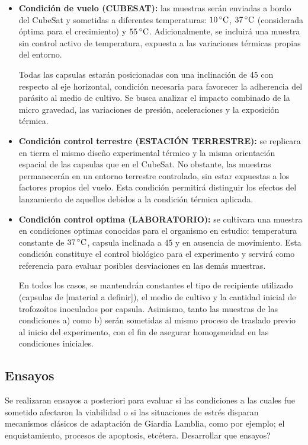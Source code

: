     \begin{itemize}
      \item \textbf{Condición de vuelo (CUBESAT):} las muestras serán enviadas a bordo del CubeSat y
      sometidas a diferentes temperaturas: $10\,^\circ\mathrm{C}$, $37\,^\circ\mathrm{C}$ (considerada óptima para el
      crecimiento) y $55\,^\circ\mathrm{C}$. Adicionalmente, se incluirá una muestra sin control activo de temperatura,
      expuesta a las variaciones térmicas propias del entorno.

      Todas las capsulas estarán posicionadas con una inclinación de 45 con respecto al eje horizontal, condición
      necesaria para favorecer la adherencia del parásito al medio de cultivo. Se busca analizar el
      impacto combinado de la micro gravedad, las variaciones de presión, aceleraciones
      y la exposición térmica.

      \item \textbf{Condición control terrestre (ESTACIÓN TERRESTRE):} se replicara en tierra
      el mismo diseño experimental térmico y la misma orientación espacial de las capsulas
      que en el CubeSat. No obstante, las muestras permanecerán en un entorno terrestre
      controlado, sin estar expuestas a los factores propios del vuelo. Esta condición permitirá
      distinguir los efectos del lanzamiento de aquellos debidos a la condición térmica
      aplicada.

      \item \textbf{Condición control optima (LABORATORIO):} se cultivara una muestra en condiciones optimas
      conocidas para el organismo en estudio: temperatura constante de
      $37\,^\circ\mathrm{C}$, capsula inclinada a 45 y en ausencia de movimiento. Esta condición constituye
      el control biológico para el experimento y servirá como referencia para evaluar posibles
      desviaciones en las demás muestras.

      En todos los casos, se mantendrán constantes el tipo de recipiente utilizado (capsulas de
      [material a definir]), el medio de cultivo y la cantidad inicial de trofozoítos inoculados por
      capsula. Asimismo, tanto las muestras de las condiciones a) como b) serán sometidas al mismo
      proceso de traslado previo al inicio del experimento, con el fin de asegurar homogeneidad en
      las condiciones iniciales.
    \end{itemize}

  \subsection{Ensayos}
    Se realizaran ensayos a posteriori para evaluar si las condiciones a las cuales fue sometido afectaron la viabilidad o si las situaciones de estrés disparan mecanismos clásicos de
    adaptación de Giardia Lamblia, como por ejemplo; el enquistamiento, procesos de apoptosis,
    etcétera. Desarrollar que ensayos?

